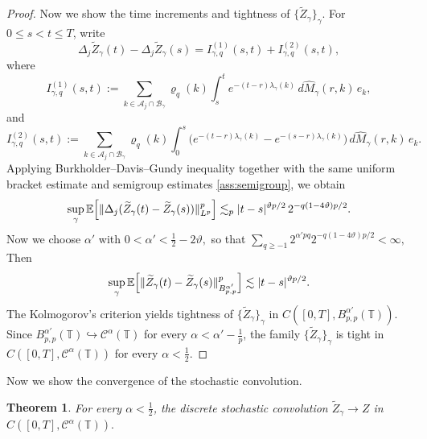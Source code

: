 \documentclass{article}
\newtheorem{theorem}{Theorem}
\begin{document}
\begin{proof}
Now we show the time increments and tightness of \(\{\widetilde Z_\gamma\}_\gamma\). For \(0\le s<t\le T\), write
\[
\Delta_j\widetilde Z_\gamma(t)-\Delta_j\widetilde Z_\gamma(s)
=
I_{\gamma,q}^{(1)}(s,t)+I_{\gamma,q}^{(2)}(s,t),
\]
where
\[
I_{\gamma,q}^{(1)}(s,t)
:=
\sum_{k\in\mathcal A_j\cap\mathcal B_\gamma}
\varrho_q(k)\int_s^t e^{-(t-r)\lambda_\gamma(k)}\,d\widehat M_\gamma(r,k)\,e_k,
\]
and
\[
I_{\gamma,q}^{(2)}(s,t)
:=
\sum_{k\in\mathcal A_j\cap\mathcal B_\gamma}
\varrho_q(k)\int_0^s
\bigl(e^{-(t-r)\lambda_\gamma(k)}-e^{-(s-r)\lambda_\gamma(k)}\bigr)\,
d\widehat M_\gamma(r,k)\,e_k.
\]
Applying Burkholder--Davis--Gundy inequality together with the same uniform
bracket estimate and semigroup estimates \ref{ass:semigroup}, we obtain
\[
\sup_\gamma
\mathbb E
\Bigl[
\|\Delta_j(\widetilde Z_\gamma(t)-\widetilde Z_\gamma(s))\|_{L^p}^p
\Bigr]
\lesssim_p
|t-s|^{\vartheta p/2}\,2^{-q(1-4\vartheta)p/2}.
\]
Now we choose \(\alpha'\) with
\(
0<\alpha'<\frac12-2\vartheta,
\)
so that
\(
\sum_{q\ge-1}2^{\alpha' pq}2^{-q(1-4\vartheta)p/2}<\infty,
\)
Then
\[
\sup_\gamma
\mathbb E
\Bigl[
\|\widetilde Z_\gamma(t)-\widetilde Z_\gamma(s)\|_{B^{\alpha'}_{p,p}}^p
\Bigr]
\lesssim
|t-s|^{\vartheta p/2}.
\]
The Kolmogorov's criterion yields tightness of \(\{\widetilde Z_\gamma\}_\gamma\) in
\(
C([0,T],B^{\alpha'}_{p,p}(\mathbb T)).
\)
Since \(B^{\alpha'}_{p,p}(\mathbb T)\hookrightarrow \mathcal C^\alpha(\mathbb T)\) for every \(\alpha<\alpha'-\frac1p\), the family \(\{\widetilde Z_\gamma\}_\gamma\) is tight in
\(
C([0,T],\mathcal C^\alpha(\mathbb T))
\)
for every \(\alpha<\frac12\).
\end{proof}

Now we show the convergence of the stochastic convolution.

\begin{theorem}
\label{thm:Zgamma-final}
For every \(\alpha<\frac12\), the discrete stochastic convolution
\(\widetilde Z_\gamma\rightarrow Z\) in \(C([0,T],\mathcal C^\alpha(\mathbb T)).\)
\end{theorem}
\end{document}

